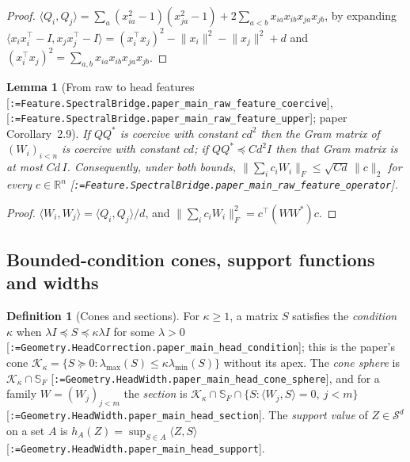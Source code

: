 \documentclass[11pt]{article}
\makeatletter
\newcommand{\formal@break}[1]{\@tfor\formal@tok:=#1\do{%
  \formal@tok
  \expandafter\ifx\formal@tok.\allowbreak\else
  \expandafter\ifx\formal@tok\_\allowbreak\fi\fi}}
\DeclareRobustCommand{\formal}[1]{\textnormal{[\texttt{\small\formal@break{#1}}]}}
\newcommand{\R}{\mathbb{R}}
\newcommand{\Sym}{\mathcal{S}}
\newcommand{\ip}[2]{\langle #1, #2\rangle}
\newcommand{\norm}[1]{\lVert #1\rVert}
\newcommand{\Fro}{F}
\newcommand{\Id}{I}
\newcommand{\cone}{\mathcal{K}}
\theoremstyle{plain}
\newtheorem{lemma}[theorem]{Lemma}
\theoremstyle{definition}
\newtheorem{definition}[theorem]{Definition}
\makeatother
\begin{document}
\begin{proof}
$\ip{Q_i}{Q_j} = \sum_{a} (x_{ia}^2 - 1)(x_{ja}^2 - 1) + 2\sum_{a < b} x_{ia}x_{ib}x_{ja}x_{jb}$,
by expanding $\ip{x_ix_i^{\top} - \Id}{x_jx_j^{\top} - \Id} = (x_i^{\top}x_j)^2 - \norm{x_i}^2 - \norm{x_j}^2 + d$
and $(x_i^{\top}x_j)^2 = \sum_{a,b} x_{ia}x_{ib}x_{ja}x_{jb}$.
\end{proof}

\begin{lemma}[From raw to head features \formal{Feature.SpectralBridge.paper\_main\_raw\_feature\_coercive}, \formal{Feature.SpectralBridge.paper\_main\_raw\_feature\_upper}; paper Corollary~2.9]\label{lem:bridge_features}
If $Q Q^{*}$ is coercive with constant $c d^2$ then the Gram matrix of
$(W_i)_{i<n}$ is coercive with constant $c d$; if $Q Q^{*} \preceq C d^2 \Id$
then that Gram matrix is at most $C d\, \Id$. Consequently, under both
bounds, $\norm{\sum_i c_i W_i}_\Fro \le \sqrt{Cd}\,\norm{c}_2$ for every
$c \in \R^n$ \formal{Feature.SpectralBridge.paper\_main\_raw\_feature\_operator}.
\end{lemma}

\begin{proof}
$\ip{W_i}{W_j} = \ip{Q_i}{Q_j}/d$, and $\norm{\sum_i c_i W_i}_\Fro^2 = c^{\top}(W W^{*})c$.
\end{proof}

\subsection{Bounded-condition cones, support functions and widths}\label{sec:cones}

\begin{definition}[Cones and sections]
For $\kappa \ge 1$, a matrix $S$ satisfies the \emph{condition $\kappa$}
when $\lambda \Id \preceq S \preceq \kappa\lambda \Id$ for some $\lambda > 0$
\formal{Geometry.HeadCorrection.paper\_main\_head\_condition}; this is the
paper's cone $\cone_\kappa = \{S \succeq 0 : \lambda_{\max}(S) \le \kappa \lambda_{\min}(S)\}$
without its apex. The \emph{cone sphere} is
$\cone_\kappa \cap \mathbb{S}_\Fro$ \formal{Geometry.HeadWidth.paper\_main\_head\_cone\_sphere},
and for a family $W = (W_j)_{j<m}$ the \emph{section} is
$\cone_\kappa \cap \mathbb{S}_\Fro \cap \{S : \ip{W_j}{S} = 0,\ j < m\}$
\formal{Geometry.HeadWidth.paper\_main\_head\_section}. The \emph{support
value} of $Z \in \Sym^d$ on a set $A$ is $h_A(Z) = \sup_{S \in A}\ip{Z}{S}$
\formal{Geometry.HeadWidth.paper\_main\_head\_support}.
\end{definition}
\end{document}
